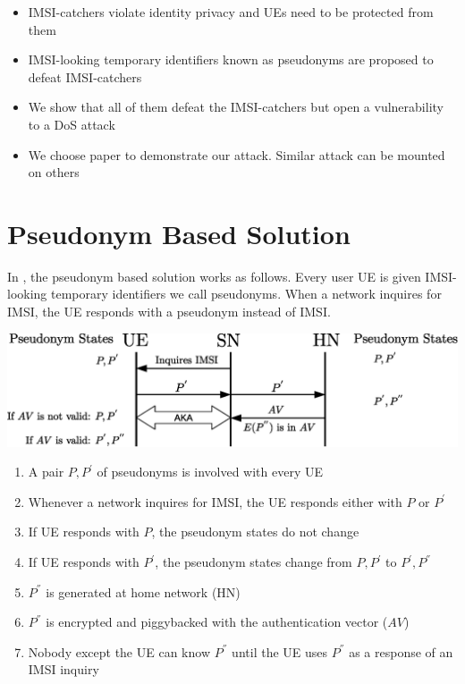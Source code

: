 \documentclass[portrait,a0]{a0poster}
\begin{document}
\begin{multicols}{2}
\begin{itemize}
\item IMSI-catchers violate identity privacy and UEs need to be protected from them
\item IMSI-looking temporary identifiers known as pseudonyms are proposed \citep{Ginzboorg_Niemi_2016,Norrman_Naslund_Dubrova_2016,CCS15,SSR15} to defeat IMSI-catchers
\item We show that all of them defeat the IMSI-catchers but open a vulnerability to a DoS attack
\item We choose \citep{CCS15} paper to demonstrate our attack. Similar attack can be mounted on others
\end{itemize}


\section{Pseudonym Based Solution}
In \citep{CCS15}, the pseudonym based solution works as follows. Every user UE is given IMSI-looking temporary identifiers we call pseudonyms. When a network inquires for IMSI, the UE responds with a pseudonym instead of IMSI.

\begin{center}
\begin{minipage}[t]{0.9\linewidth} %
\vspace{.25cm} %
\includegraphics[width=1\linewidth]{ccs_solution.eps}
\hspace{0pt}
\vspace{.25cm}
\end{minipage}
\end{center}

\begin{enumerate}
\item A pair $P,P^{'}$ of pseudonyms is involved with every UE
\item Whenever a network inquires for IMSI, the UE responds either with $P$ or $P^{'}$
\item If UE responds with $P$, the pseudonym states do not change
\item \label{item:weakness} If UE responds with $P^{'}$, the pseudonym states change from $P,P^{'}$ to $P^{'},P^{''}$
\item $P^{''}$ is generated at home network (HN)
\item $P^{''}$ is encrypted and piggybacked with the authentication vector ($AV$)
\item Nobody except the UE can know $P^{''}$ until the UE uses $P^{''}$ as a response of an IMSI inquiry
\end{enumerate}


\end{multicols}
\end{document}
